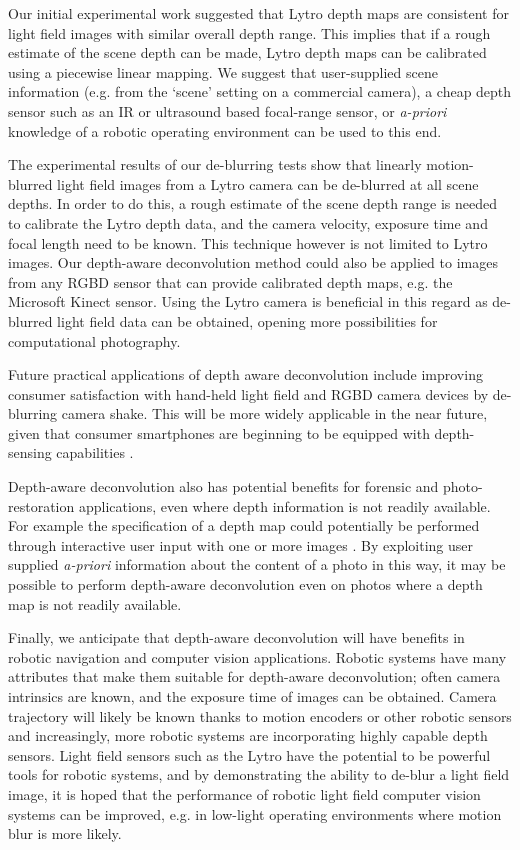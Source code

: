 Our initial experimental work suggested that Lytro depth maps are consistent for light field images with similar overall depth range.
This implies that if a rough estimate of the scene depth can be made, Lytro depth maps can be calibrated using a piecewise linear mapping.
We suggest that user-supplied scene information (e.g. from the \enquote*{scene} setting on a commercial camera), a cheap depth sensor such as an IR or ultrasound based focal-range sensor, or \emph{a-priori} knowledge of a robotic operating environment can be used to this end.

The experimental results of our de-blurring tests show that linearly motion-blurred light field images from a Lytro camera can be de-blurred at all scene depths.
In order to do this, a rough estimate of the scene depth range is needed to calibrate the Lytro depth data, and the camera velocity, exposure time and focal length need to be known.
This technique however is not limited to Lytro images.
Our depth-aware deconvolution method could also be applied to images from any RGBD sensor that can provide calibrated depth maps, e.g. the Microsoft Kinect sensor. 
Using the Lytro camera is beneficial in this regard as de-blurred light field data can be obtained, opening more possibilities for computational photography.

Future practical applications of depth aware deconvolution include improving consumer satisfaction with hand-held light field and RGBD camera devices by de-blurring camera shake.
This will be more widely applicable in the near future, given that consumer smartphones are beginning to be equipped with depth-sensing capabilities \cite{google2014lensblur, google2014tango}.

Depth-aware deconvolution also has potential benefits for forensic and photo-restoration applications, even where depth information is not readily available.
For example the specification of a depth map could potentially be performed through interactive user input with one or more images \cite{sinha2008interactive}.
By exploiting user supplied \emph{a-priori} information about the content of a photo in this way, it may be possible to perform depth-aware deconvolution even on photos where a depth map is not readily available. 

Finally, we anticipate that depth-aware deconvolution will have benefits in robotic navigation and computer vision applications.
Robotic systems have many attributes that make them suitable for depth-aware deconvolution; often camera intrinsics are known, and the exposure time of images can be obtained.
Camera trajectory will likely be known thanks to motion encoders or other robotic sensors and increasingly, more robotic systems are incorporating highly capable depth sensors.
Light field sensors such as the Lytro have the potential to be powerful tools for robotic systems, and by demonstrating the ability to de-blur a light field image, it is hoped that the performance of robotic light field computer vision systems can be improved, e.g. in low-light operating environments where motion blur is more likely.


